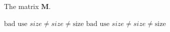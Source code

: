 \documentclass{article}
\begin{document}
The matrix $\mathbf{M}$.

$\text{bad use } size \neq \mathit{size} \neq \mathrm{size} $
\textit{$\text{bad use } size \neq \mathit{size} \neq \mathrm{size} $}
\end{document}
